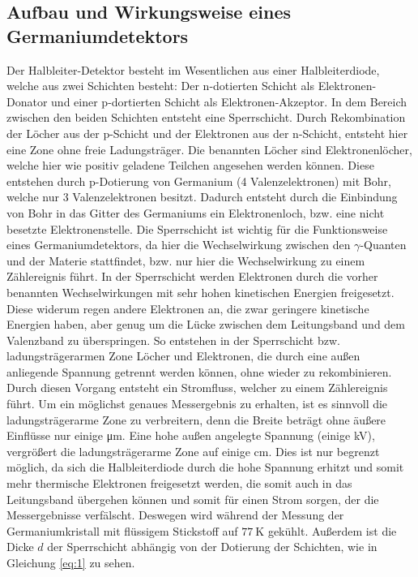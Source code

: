 \subsection{Aufbau und Wirkungsweise eines Germaniumdetektors}
Der Halbleiter-Detektor besteht im Wesentlichen aus einer Halbleiterdiode,
welche aus zwei Schichten besteht: Der n-dotierten Schicht als
Elektronen-Donator und einer p-dortierten Schicht als Elektronen-Akzeptor.
In dem Bereich zwischen den beiden Schichten entsteht eine Sperrschicht. Durch
Rekombination der Löcher aus der p-Schicht und der Elektronen aus der n-Schicht,
entsteht hier eine Zone ohne freie Ladungsträger.
Die benannten Löcher sind Elektronenlöcher, welche hier wie positiv geladene
Teilchen angesehen werden können. Diese entstehen durch p-Dotierung von Germanium
(4 Valenzelektronen) mit Bohr, welche nur 3 Valenzelektronen besitzt. Dadurch
entsteht durch die Einbindung von Bohr in das Gitter des Germaniums ein
Elektronenloch, bzw. eine nicht besetzte Elektronenstelle.
Die Sperrschicht ist wichtig für die Funktionsweise eines Germaniumdetektors,
da hier die Wechselwirkung zwischen den $\gamma$-Quanten und der Materie
stattfindet, bzw. nur hier die Wechselwirkung zu einem Zählereignis führt.
In der Sperrschicht werden Elektronen durch die vorher benannten Wechselwirkungen
mit sehr hohen kinetischen Energien freigesetzt. Diese widerum regen andere
Elektronen an, die zwar geringere kinetische Energien haben, aber genug um die
Lücke zwischen dem Leitungsband und dem Valenzband zu überspringen. So
entstehen in der Sperrschicht bzw. ladungsträgerarmen Zone Löcher und Elektronen,
die durch eine außen anliegende Spannung getrennt werden können, ohne wieder zu
rekombinieren. Durch diesen Vorgang entsteht ein Stromfluss, welcher zu einem
Zählereignis führt.
Um ein möglichst genaues Messergebnis zu erhalten, ist es sinnvoll die
ladungsträgerarme Zone zu verbreitern, denn die Breite beträgt ohne äußere Einflüsse
nur einige \si{\micro\meter}. Eine hohe außen angelegte Spannung (einige \si{\kilo\volt}), vergrößert
die ladungsträgerarme Zone auf einige \si{\centi\meter}. Dies ist nur begrenzt
möglich, da sich die Halbleiterdiode durch die hohe Spannung erhitzt und somit mehr
thermische Elektronen freigesetzt werden, die somit auch in das Leitungsband
übergehen können und somit für einen Strom sorgen, der die Messergebnisse
verfälscht. Deswegen wird während der Messung der Germaniumkristall mit
flüssigem Stickstoff auf $\SI{77}{\kelvin}$ gekühlt.
Außerdem ist die Dicke $d$ der Sperrschicht abhängig von der Dotierung
der Schichten, wie in Gleichung \eqref{eq:1} zu sehen.

